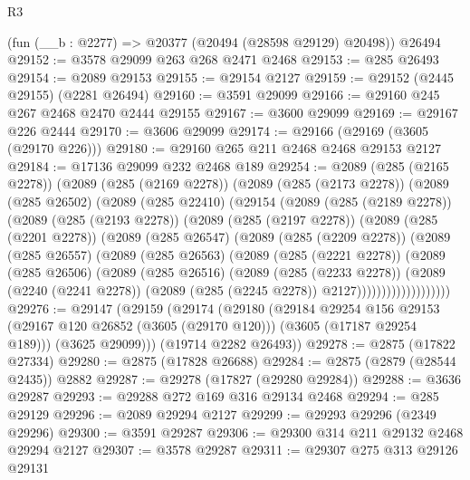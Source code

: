 \begin{lexlean}{R3}
\begin{coremodule}
    (fun (__b : @2277) => @20377 (@20494 (@28598 @29129) @20498))
    @26494
@29152 := @3578 @29099 @263 @268 @2471 @2468
@29153 := @285 @26493
@29154 := @2089 @29153
@29155 := @29154 @2127
@29159 := @29152 (@2445 @29155) (@2281 @26494)
@29160 := @3591 @29099
@29166 := @29160 @245 @267 @2468 @2470 @2444 @29155
@29167 := @3600 @29099
@29169 := @29167 @226 @2444
@29170 := @3606 @29099
@29174 := @29166 (@29169 (@3605 (@29170 @226)))
@29180 := @29160 @265 @211 @2468 @2468 @29153 @2127
@29184 := @17136 @29099 @232 @2468 @189
@29254 := @2089
    (@285 (@2165 @2278))
    (@2089
      (@285 (@2169 @2278))
      (@2089
        (@285 (@2173 @2278))
        (@2089
          (@285 @26502)
          (@2089
            (@285 @22410)
            (@29154
              (@2089
                (@285 (@2189 @2278))
                (@2089
                  (@285 (@2193 @2278))
                  (@2089
                    (@285 (@2197 @2278))
                    (@2089
                      (@285 (@2201 @2278))
                      (@2089
                        (@285 @26547)
                        (@2089
                          (@285 (@2209 @2278))
                          (@2089
                            (@285 @26557)
                            (@2089
                              (@285 @26563)
                              (@2089
                                (@285 (@2221 @2278))
                                (@2089
                                  (@285 @26506)
                                  (@2089
                                    (@285 @26516)
                                    (@2089
                                      (@285 (@2233 @2278))
                                      (@2089
                                        (@2240 (@2241 @2278))
                                        (@2089 (@285 (@2245 @2278)) @2127)))))))))))))))))))
@29276 := @29147
    (@29159
      (@29174
        (@29180
          (@29184
            @29254
            @156
            @29153
            (@29167 @120 @26852 (@3605 (@29170 @120)))
            (@3605 (@17187 @29254 @189)))
          (@3625 @29099)))
      (@19714 @2282 @26493))
@29278 := @2875 (@17822 @27334)
@29280 := @2875 (@17828 @26688)
@29284 := @2875 (@2879 (@28544 @2435)) @2882
@29287 := @29278 (@17827 (@29280 @29284))
@29288 := @3636 @29287
@29293 := @29288 @272 @169 @316 @29134 @2468
@29294 := @285 @29129
@29296 := @2089 @29294 @2127
@29299 := @29293 @29296 (@2349 @29296)
@29300 := @3591 @29287
@29306 := @29300 @314 @211 @29132 @2468 @29294 @2127
@29307 := @3578 @29287
@29311 := @29307 @275 @313 @29126 @29131

\end{coremodule}
\end{lexlean}
